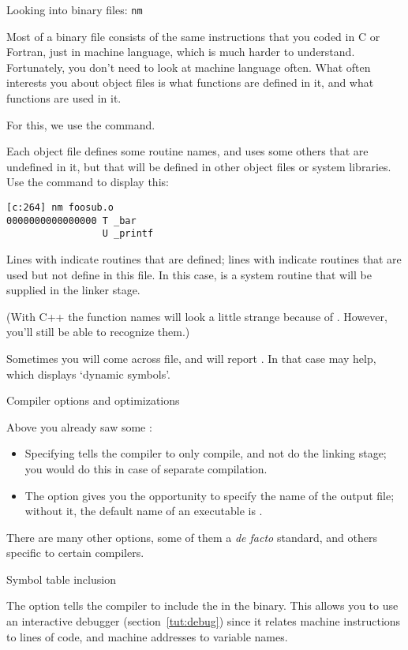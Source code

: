  {Looking into binary files: \texttt{nm}}

Most of a binary file consists of the same instructions that you
coded in C or Fortran, just in machine language, which
is much harder to understand.
Fortunately, you don't need to look at machine language often.
What often interests you about object files is what functions are
defined in it, and what functions are used in it.

For this, we use the  command.

Each object file defines some routine names, and uses some others that
are undefined in it, but that will be defined in other object files or
system libraries. Use the  command to display
this:
\begin{verbatim}
[c:264] nm foosub.o
0000000000000000 T _bar
                 U _printf
\end{verbatim}
Lines with  indicate routines that are defined; lines with 
indicate routines that are used but not define in this file. In this
case,  is a system routine that will be supplied in the
linker stage.

(With C++ the function names will look a little strange
because of . However, you'll still
be able to recognize them.)

Sometimes you will come across  file,
and  will report .
In that case  may help, which displays `dynamic symbols'.

 {Compiler options and optimizations}

Above you already saw some :
\begin{itemize}
\item Specifying  tells the compiler to only compile, and not do
  the linking stage; you would do this in case of separate
  compilation.
\item The option  gives you the opportunity to specify the name
  of the output file; without it, the default name of an executable is
  .
\end{itemize}

There are many other options, some of them a \emph{de facto} standard,
and others specific to certain compilers.

 {Symbol table inclusion}

The  option tells the compiler to include the  in the binary.  This allows you to use an interactive
debugger (section~\ref{tut:debug}) since it relates machine
instructions to lines of code, and machine addresses to variable
names.

